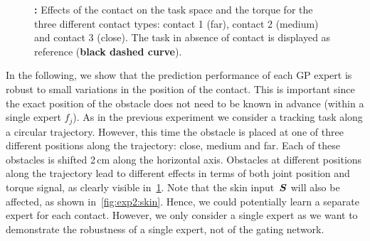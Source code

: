 	\begin{figure}[t]
		\caption{\textbf{:} Effects of the contact on the task space and the torque for the three different contact types: contact 1 (far), contact 2 (medium) and contact 3 (close). 
		The task in absence of contact is displayed as reference (\textbf{black dashed curve}). 
		}
		\label{fig:exp2:effects_contact}
	\end{figure}
	
	In the following, we show that the prediction performance of each GP expert is robust to small variations in the position of the contact.
	This is important since the exact position of the obstacle does not need to be known in advance (within a single expert $f_j$).
	As in the previous experiment we consider a tracking task along a circular trajectory.
	However, this time the obstacle is placed at one of three different positions along the trajectory: close, medium and far.
    Each of these obstacles is shifted 2\,cm along the horizontal axis.
	Obstacles at different positions along the trajectory lead to different effects in terms of both joint position and torque signal, as clearly visible in~\fig\ref{fig:exp2:effects_contact}.
	Note that the skin input~$\mathcal{\boldsymbol{S}}$ will also be affected, as shown in~\fig\ref{fig:exp2:skin}. 
    Hence, we could potentially learn a separate expert for each contact. 
    However, we only consider a single expert as we want to demonstrate the robustness of a single expert, not of the gating network.
    
